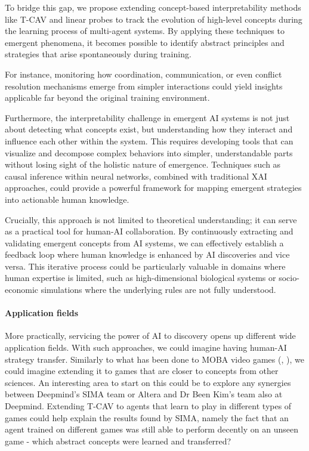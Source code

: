 \documentclass[11pt]{article}
\begin{document}
To bridge this gap, we propose extending concept-based interpretability methods like T-CAV and linear probes to track the evolution of high-level concepts during the learning process of multi-agent systems. By applying these techniques to emergent phenomena, it becomes possible to identify abstract principles and strategies that arise spontaneously during training. 

For instance, monitoring how coordination, communication, or even conflict resolution mechanisms emerge from simpler interactions could yield insights applicable far beyond the original training environment.

Furthermore, the interpretability challenge in emergent AI systems is not just about detecting what concepts exist, but understanding how they interact and influence each other within the system. This requires developing tools that can visualize and decompose complex behaviors into simpler, understandable parts without losing sight of the holistic nature of emergence. Techniques such as causal inference within neural networks, combined with traditional XAI approaches, could provide a powerful framework for mapping emergent strategies into actionable human knowledge.

Crucially, this approach is not limited to theoretical understanding; it can serve as a practical tool for human-AI collaboration. By continuously extracting and validating emergent concepts from AI systems, we can effectively establish a feedback loop where human knowledge is enhanced by AI discoveries and vice versa. This iterative process could be particularly valuable in domains where human expertise is limited, such as high-dimensional biological systems or socio-economic simulations where the underlying rules are not fully understood.



\paragraph{Application fields} More practically, servicing the power of AI to discovery opens up different wide application fields.
With such approaches, we could imagine having human-AI strategy transfer. Similarly to what has been done to MOBA video games (\cite{openai_five}, \cite{fair_starcraft}), we could imagine extending it to games that are closer to concepts from other sciences.
An interesting area to start on this could be to explore any synergies between Deepmind's SIMA team \cite{sima} or Altera \cite{altera} and Dr Been Kim's team also at Deepmind. Extending T-CAV to agents that learn to play in different types of games could help explain the results found by SIMA, namely the fact that an agent trained on different games was still able to perform decently on an unseen game - which abstract concepts were learned and transferred?
\end{document}
